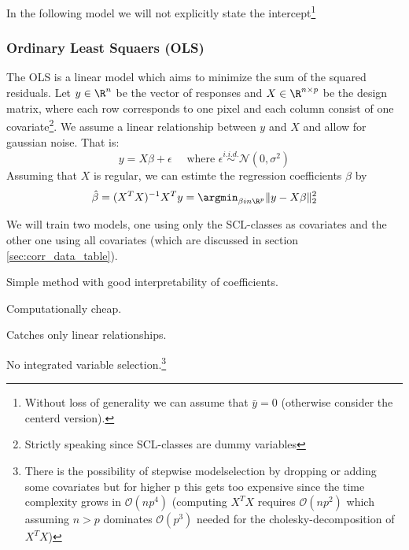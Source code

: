 In the following model we will not explicitly state the intercept\footnote{Without loss of generality we can assume that $\bar y = 0$ (otherwise consider the centerd version).} 

\subsubsection*{Ordinary Least Squaers (OLS)}{
    The OLS is a linear model which aims to minimize the sum of the squared residuals. Let $y\in \R^n$ be the vector of responses and $X\in \R^{n\times p}$ be the design matrix, where each row corresponds to one pixel and each column consist of one covariate\footnote{Strictly speaking since SCL-classes are dummy variables }. We assume a linear relationship between $y$ and $X$ and allow for gaussian noise. That is:
    \begin{equation}
        \label{eq:ols}
        y = X\beta  + \epsilon \quad \text{ where }\epsilon \overset{i.i.d.}{\sim}\mathcal{N}(0,\sigma^2)
    \end{equation}
    Assuming that $X$ is regular, we can estimte the regression coefficients $\beta$ by
    \begin{equation}
        \hat \beta = (X^TX)^{-1}X^Ty = \argmin_{\beta in \R^p}\|y - X\beta\|_2^2 
    \end{equation}

    We will train two models, one using only the SCL-classes as covariates and the other one using all covariates (which are discussed in section \ref{sec:corr_data_table}).

    \begin{my_pros_cons_table}{
        \item Simple method with good interpretability of coefficients.
        \item Computationally cheap.
    }{
        \item Catches only linear relationships.
        \item No integrated variable selection.\footnote{There is the possibility of stepwise modelselection by dropping or adding some covariates but for higher p this gets too expensive since the time complexity grows in $\mathcal{O}(np^4)$ (computing $X^TX$ requires $\mathcal{O}(np^2)$ which assuming $n>p$ dominates $\mathcal{O}(p^3) $ needed for the cholesky-decomposition of $X^TX$) %
        }
    }
    \end{my_pros_cons_table}
}
